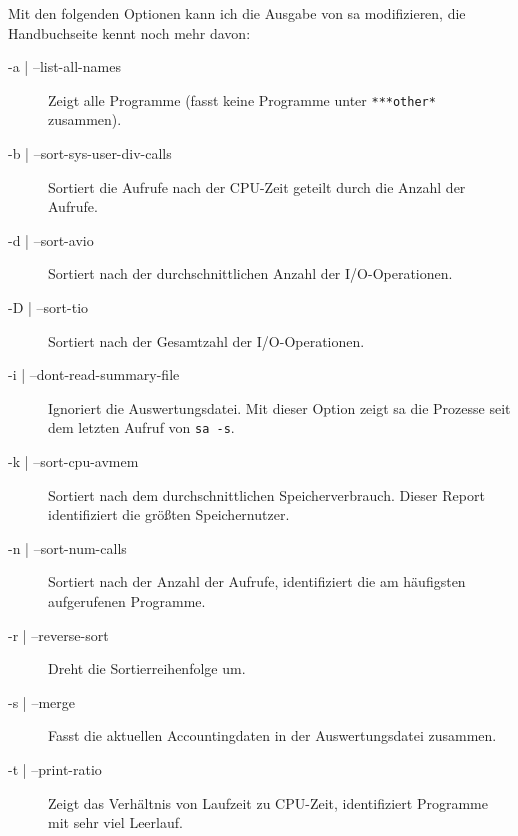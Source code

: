 \begin{normaltext}
  Mit den folgenden Optionen kann ich die Ausgabe von sa modifizieren, die
  Handbuchseite kennt noch mehr davon:
  \begin{description}
    \item[-a | --list-all-names] Zeigt alle Programme (fasst keine Programme unter
      \verb?***other*? zusammen).
    \item[-b | --sort-sys-user-div-calls] Sortiert die Aufrufe nach der
      CPU-Zeit geteilt durch die Anzahl der Aufrufe.
    \item[-d | --sort-avio] Sortiert nach der durchschnittlichen Anzahl der
      I/O-Operationen.
    \item[-D | --sort-tio] Sortiert nach der Gesamtzahl der I/O-Operationen.
    \item[-i | --dont-read-summary-file] Ignoriert die Auswertungsdatei. Mit
      dieser Option zeigt sa die Prozesse seit dem letzten Aufruf von 
      \verb?sa -s?.
    \item[-k | --sort-cpu-avmem] Sortiert nach dem durchschnittlichen
      Speicherverbrauch. Dieser Report identifiziert die größten
      Speichernutzer.
    \item[-n | --sort-num-calls] Sortiert nach der Anzahl der Aufrufe,
      identifiziert die am häufigsten aufgerufenen Programme.
    \item[-r | --reverse-sort] Dreht die Sortierreihenfolge um.
    \item[-s | --merge] Fasst die aktuellen Accountingdaten in der
      Auswertungsdatei zusammen.
    \item[-t | --print-ratio] Zeigt das Verhältnis von Laufzeit zu CPU-Zeit,
      identifiziert Programme mit sehr viel Leerlauf.
  \end{description}
\end{normaltext}

